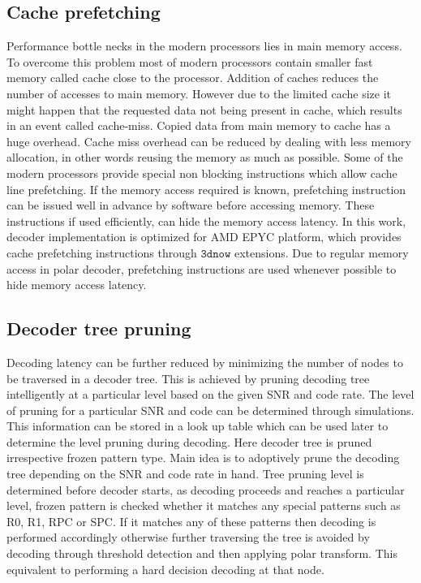 
\subsection{Cache prefetching}
Performance bottle necks in the modern processors lies in main memory access. To overcome this problem most of modern processors contain smaller fast memory called cache close to the processor. Addition of caches reduces the number of accesses to main memory. However due to the limited cache size it might happen that the requested data not being present in cache, which results in an event called cache-miss. Copied data from main memory to cache has a huge overhead. Cache miss overhead can be reduced by dealing with less memory allocation, in other words reusing the memory as much as possible. Some of the modern processors provide special non blocking instructions which allow cache line prefetching. If the memory access required is known, prefetching instruction can be issued well in advance by software before accessing memory. These instructions if used efficiently, can hide the memory access latency. In this work, decoder implementation is optimized for AMD EPYC platform, which provides cache prefetching instructions through $ \mathtt{3dnow} $ extensions. Due to regular memory access in polar decoder, prefetching instructions are used whenever possible to hide memory access latency.

\subsection{Decoder tree pruning}
Decoding latency can be further reduced by minimizing the number of nodes to be traversed in a decoder tree. This is achieved by pruning decoding tree intelligently at a particular level based on the given SNR and code rate. The level of pruning for a particular SNR and code can be determined through simulations. This information can be stored in a look up table which can be used later to determine the level pruning during decoding. Here decoder tree is pruned irrespective frozen pattern type. Main idea is to adoptively prune the decoding tree depending on the SNR and code rate in hand. Tree pruning level is determined before decoder starts, as decoding proceeds and reaches a particular level, frozen pattern is checked whether it matches any special patterns such as R0, R1, RPC or SPC. If it matches any of these patterns then decoding is performed accordingly otherwise further traversing the tree is avoided by decoding through threshold detection and then applying polar transform. This equivalent to performing a hard decision decoding at that node.

